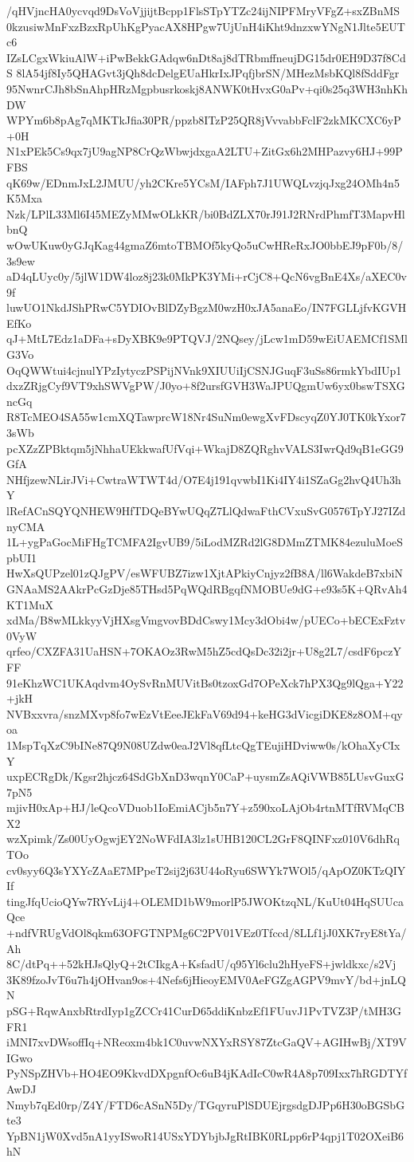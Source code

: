 /qHVjncHA0ycvqd9DsVoVjjijtBcpp1FlsSTpYTZc24ijNIPFMryVFgZ+sxZBnMS
0kzusiwMnFxzBzxRpUhKgPyacAX8HPgw7UjUnH4iKht9dnzxwYNgN1Jlte5EUTc6
IZsLCgxWkiuAlW+iPwBekkGAdqw6nDt8aj8dTRbmffneujDG15dr0EH9D37f8CdS
8lA54jf8Iy5QHAGvt3jQh8dcDelgEUaHkrIxJPqfjbrSN/MHezMsbKQl8fSddFgr
95NwnrCJh8bSnAhpHRzMgpbusrkoskj8ANWK0tHvxG0aPv+qi0s25q3WH3nhKhDW
WPYm6b8pAg7qMKTkJfia30PR/ppzb8ITzP25QR8jVvvabbFclF2zkMKCXC6yP+0H
N1xPEk5Cs9qx7jU9agNP8CrQzWbwjdxgaA2LTU+ZitGx6h2MHPazvy6HJ+99PFBS
qK69w/EDnmJxL2JMUU/yh2CKre5YCsM/IAFph7J1UWQLvzjqJxg24OMh4n5K5Mxa
Nzk/LPlL33Ml6I45MEZyMMwOLkKR/bi0BdZLX70rJ91J2RNrdPhmfT3MapvHlbnQ
wOwUKuw0yGJqKag44gmaZ6mtoTBMOf5kyQo5uCwHReRxJO0bbEJ9pF0b/8/3s9ew
aD4qLUyc0y/5jlW1DW4loz8j23k0MkPK3YMi+rCjC8+QcN6vgBnE4Xs/aXEC0v9f
luwUO1NkdJShPRwC5YDIOvBlDZyBgzM0wzH0xJA5anaEo/IN7FGLLjfvKGVHEfKo
qJ+MtL7Edz1aDFa+sDyXBK9e9PTQVJ/2NQsey/jLcw1mD59wEiUAEMCf1SMlG3Vo
OqQWWtui4cjnulYPzIytyczPSPijNVnk9XIUUiIjCSNJGuqF3uSs86rmkYbdIUp1
dxzZRjgCyf9VT9xhSWVgPW/J0yo+8f2ursfGVH3WaJPUQgmUw6yx0bswTSXGncGq
R8TcMEO4SA55w1cmXQTawprcW18Nr4SuNm0ewgXvFDscyqZ0YJ0TK0kYxor73sWb
pcXZzZPBktqm5jNhhaUEkkwafUfVqi+WkajD8ZQRghvVALS3IwrQd9qB1eGG9GfA
NHfjzewNLirJVi+CwtraWTWT4d/O7E4j191qvwbI1Ki4IY4i1SZaGg2hvQ4Uh3hY
lRefACnSQYQNHEW9HfTDQeBYwUQqZ7LlQdwaFthCVxuSvG0576TpYJ27IZdnyCMA
1L+ygPaGocMiFHgTCMFA2IgvUB9/5iLodMZRd2lG8DMmZTMK84ezuluMoeSpbUI1
HwXsQUPzel01zQJgPV/esWFUBZ7izw1XjtAPkiyCnjyz2fB8A/ll6WakdeB7xbiN
GNAaMS2AAkrPcGzDje85THsd5PqWQdRBgqfNMOBUe9dG+e93s5K+QRvAh4KT1MuX
xdMa/B8wMLkkyyVjHXsgVmgvovBDdCswy1Mcy3dObi4w/pUECo+bECExFztv0VyW
qrfeo/CXZFA31UaHSN+7OKAOz3RwM5hZ5cdQsDc32i2jr+U8g2L7/csdF6pczYFF
91eKhzWC1UKAqdvm4OySvRnMUVitBs0tzoxGd7OPeXck7hPX3Qg9lQga+Y22+jkH
NVBxxvra/snzMXvp8fo7wEzVtEeeJEkFaV69d94+keHG3dVicgiDKE8z8OM+qyoa
1MspTqXzC9bINe87Q9N08UZdw0eaJ2Vl8qfLtcQgTEujiHDviww0s/kOhaXyCIxY
uxpECRgDk/Kgsr2hjcz64SdGbXnD3wqnY0CaP+uysmZsAQiVWB85LUsvGuxG7pN5
mjivH0xAp+HJ/leQcoVDuob1IoEmiACjb5n7Y+z590xoLAjOb4rtnMTfRVMqCBX2
wzXpimk/Zs00UyOgwjEY2NoWFdIA3lz1sUHB120CL2GrF8QINFxz010V6dhRqTOo
cv0syy6Q3sYXYcZAaE7MPpeT2sij2j63U44oRyu6SWYk7WOl5/qApOZ0KTzQIYIf
tingJfqUcioQYw7RYvLij4+OLEMD1bW9morlP5JWOKtzqNL/KuUt04HqSUUcaQce
+ndfVRUgVdOl8qkm63OFGTNPMg6C2PV01VEz0Tfccd/8LLf1jJ0XK7ryE8tYa/Ah
8C/dtPq++52kHJsQlyQ+2tCIkgA+KsfadU/q95Yl6clu2hHyeFS+jwldkxc/s2Vj
3K89fzoJvT6u7h4jOHvan9os+4Nefs6jHieoyEMV0AeFGZgAGPV9mvY/bd+jnLQN
pSG+RqwAnxbRtrdIyp1gZCCr41CurD65ddiKnbzEf1FUuvJ1PvTVZ3P/tMH3GFR1
iMNI7xvDWsoffIq+NReoxm4bk1C0uvwNXYxRSY87ZtcGaQV+AGIHwBj/XT9VIGwo
PyNSpZHVb+HO4EO9KkvdDXpgnfOc6uB4jKAdIcC0wR4A8p709Ixx7hRGDTYfAwDJ
Nmyb7qEd0rp/Z4Y/FTD6cASnN5Dy/TGqyruPlSDUEjrgsdgDJPp6H30oBGSbGte3
YpBN1jW0Xvd5nA1yyISwoR14USxYDYbjbJgRtIBK0RLpp6rP4qpj1T02OXeiB6hN
